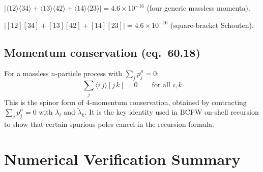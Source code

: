 \documentclass[12pt]{article}
\newcommand{\verified}[1]{\textcolor{verifygreen}{\checkmark\; #1}}
\begin{document}
\verified{$|\langle12\rangle\langle34\rangle+\langle13\rangle\langle42\rangle+\langle14\rangle\langle23\rangle|
= 4.6\times10^{-16}$ (four generic massless momenta).}

\verified{$|[12][34]+[13][42]+[14][23]| = 4.6\times10^{-16}$ (square-bracket Schouten).}

\subsection{Momentum conservation (eq.~60.18)}

For a massless $n$-particle process with $\sum_j p_j^\mu = 0$:
\begin{equation}
  \sum_j \langle i\,j\rangle[j\,k] = 0
  \qquad \text{for all } i, k
  \tag{60.18}
\end{equation}
This is the spinor form of 4-momentum conservation, obtained by contracting
$\sum_j p_j^\mu = 0$ with $\lambda_i$ and $\tilde\lambda_k$.  It is the key
identity used in BCFW on-shell recursion to show that certain spurious poles
cancel in the recursion formula.

\section{Numerical Verification Summary}
\end{document}
